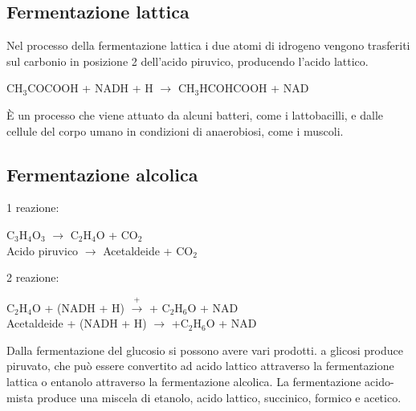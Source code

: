 \subsection{Fermentazione lattica}
Nel processo della fermentazione lattica i due atomi di idrogeno vengono trasferiti sul carbonio in posizione 2 dell'acido piruvico, producendo l'acido lattico.
\\\begin{center}CH$_3$COCOOH\ap{-} + NADH + H\ap{+} $\xrightarrow{}$ CH$_3$HCOHCOOH + NAD\ap{+}\end{center} 
\`E un processo che viene attuato da alcuni batteri, come i lattobacilli, e dalle cellule del corpo umano in condizioni di anaerobiosi, come i muscoli. 
\subsection{Fermentazione alcolica}
1 reazione:
\begin{center}
    C$_3$H$_4$O$_3$ $\xrightarrow{}$ C$_2$H$_4$O + CO$_2$
    \\Acido piruvico $\xrightarrow{}$ Acetaldeide + CO$_2$
\end{center}
2 reazione:
\begin{center}
    C$_2$H$_4$O + (NADH + H\ap{+}) $\xrightarrow{+}$ + C$_2$H$_6$O + NAD\ap{+}
    \\Acetaldeide + (NADH + H\ap{+}) $\xrightarrow{}$ +C$_2$H$_6$O + NAD\ap{+} 
\end{center}
Dalla fermentazione del glucosio si possono avere vari prodotti. a glicosi produce piruvato, che pu\`o essere convertito ad acido lattico attraverso la fermentazione lattica o entanolo attraverso la fermentazione alcolica. La fermentazione acido-mista produce una miscela di etanolo, acido lattico, succinico, formico e acetico.
